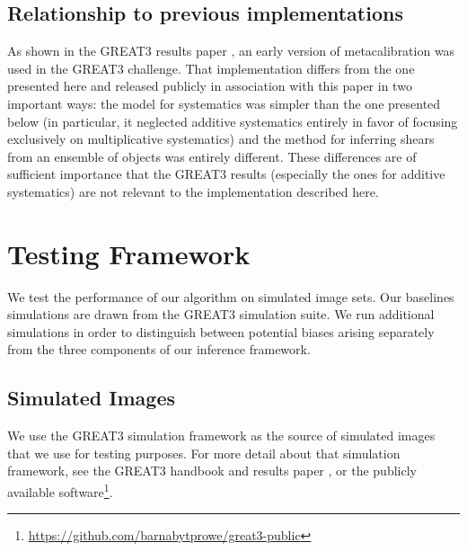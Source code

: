 \documentclass[iop]{emulateapj}
\begin{document}
\subsection{Relationship to previous implementations}

As shown in the GREAT3 results paper \citep{2015MNRAS.450.2963M}, an
early version of metacalibration was used in the GREAT3 challenge.
That implementation differs from the one presented here and released
publicly in association with this paper in two important ways: the
model for systematics was simpler than the one presented below (in
particular, it neglected additive systematics entirely in favor of
focusing exclusively on multiplicative systematics) and the method for
inferring shears from an ensemble of objects was entirely different.
These differences are of sufficient importance that the GREAT3 results
(especially the ones for additive systematics) are not relevant to the
implementation described here.


\section{Testing Framework}
We test the performance of our algorithm on simulated image sets. Our
baselines simulations are drawn from the GREAT3 simulation suite. We
run additional simulations in order to distinguish between potential
biases arising separately from the three components of our inference
framework.


\subsection{Simulated Images}

We use the GREAT3 simulation framework as the source of simulated
images that we use for testing purposes.  For more detail about that
simulation framework, see the GREAT3 handbook
\citep{2014ApJS..212....5M} and results paper
\citep{2015MNRAS.450.2963M}, or the publicly available
software\footnote{\url{https://github.com/barnabytprowe/great3-public}}.
\end{document}

